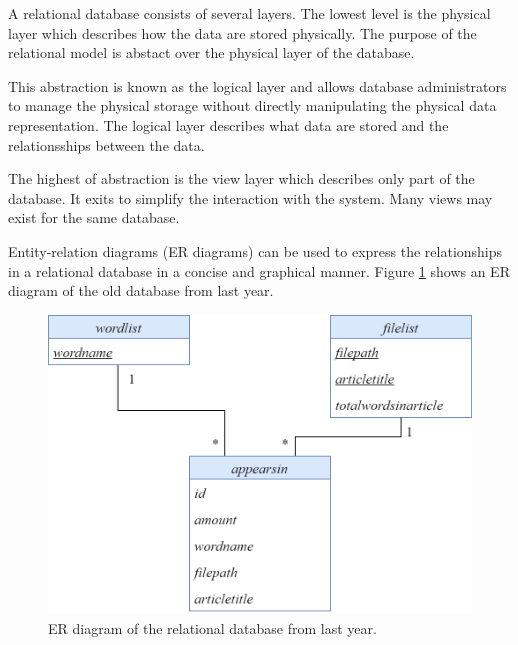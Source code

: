 A relational database consists of several layers.
The lowest level is the physical layer which describes how the data are stored physically.
The purpose of the relational model is abstact over the physical layer of the database.

This abstraction is known as the logical layer and allows database administrators to manage the physical storage without directly manipulating the physical data representation.
The logical layer describes what data are stored and the relationsships between the data.

The highest of abstraction is the view layer which describes only part of the database. It exits to simplify the interaction with the system. Many views may exist for the same database.

Entity-relation diagrams (ER diagrams) can be used to express the relationships in a relational database in a concise and graphical manner.
Figure \ref{olddatabase} shows an ER diagram of the old database from last year.


\begin{figure}[h]
    \centering
    \includegraphics[width=\linewidth]{Images/old wordcount db.PNG}
    \caption{ER diagram of the relational database from last year.}
    \label{olddatabase}
\end{figure}
